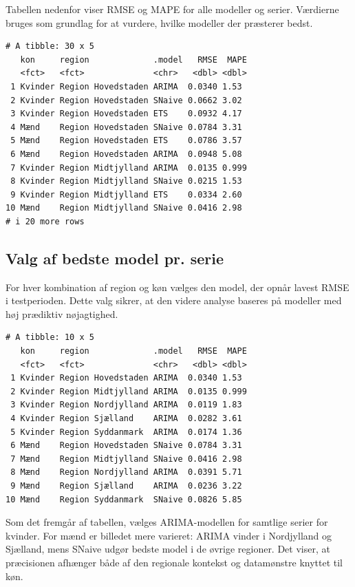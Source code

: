 \documentclass[
]{article}
\begin{document}
Tabellen nedenfor viser RMSE og MAPE for alle modeller og serier.
Værdierne bruges som grundlag for at vurdere, hvilke modeller der
præsterer bedst.

\begin{verbatim}
# A tibble: 30 x 5
   kon     region             .model   RMSE  MAPE
   <fct>   <fct>              <chr>   <dbl> <dbl>
 1 Kvinder Region Hovedstaden ARIMA  0.0340 1.53 
 2 Kvinder Region Hovedstaden SNaive 0.0662 3.02 
 3 Kvinder Region Hovedstaden ETS    0.0932 4.17 
 4 Mænd    Region Hovedstaden SNaive 0.0784 3.31 
 5 Mænd    Region Hovedstaden ETS    0.0786 3.57 
 6 Mænd    Region Hovedstaden ARIMA  0.0948 5.08 
 7 Kvinder Region Midtjylland ARIMA  0.0135 0.999
 8 Kvinder Region Midtjylland SNaive 0.0215 1.53 
 9 Kvinder Region Midtjylland ETS    0.0334 2.60 
10 Mænd    Region Midtjylland SNaive 0.0416 2.98 
# i 20 more rows
\end{verbatim}

\subsection{Valg af bedste model pr.
serie}\label{valg-af-bedste-model-pr.-serie}

For hver kombination af region og køn vælges den model, der opnår lavest
RMSE i testperioden. Dette valg sikrer, at den videre analyse baseres på
modeller med høj prædiktiv nøjagtighed.

\begin{verbatim}
# A tibble: 10 x 5
   kon     region             .model   RMSE  MAPE
   <fct>   <fct>              <chr>   <dbl> <dbl>
 1 Kvinder Region Hovedstaden ARIMA  0.0340 1.53 
 2 Kvinder Region Midtjylland ARIMA  0.0135 0.999
 3 Kvinder Region Nordjylland ARIMA  0.0119 1.83 
 4 Kvinder Region Sjælland    ARIMA  0.0282 3.61 
 5 Kvinder Region Syddanmark  ARIMA  0.0174 1.36 
 6 Mænd    Region Hovedstaden SNaive 0.0784 3.31 
 7 Mænd    Region Midtjylland SNaive 0.0416 2.98 
 8 Mænd    Region Nordjylland ARIMA  0.0391 5.71 
 9 Mænd    Region Sjælland    ARIMA  0.0236 3.22 
10 Mænd    Region Syddanmark  SNaive 0.0826 5.85 
\end{verbatim}

Som det fremgår af tabellen, vælges ARIMA-modellen for samtlige serier
for kvinder. For mænd er billedet mere varieret: ARIMA vinder i
Nordjylland og Sjælland, mens SNaive udgør bedste model i de øvrige
regioner. Det viser, at præcisionen afhænger både af den regionale
kontekst og datamønstre knyttet til køn.
\end{document}
